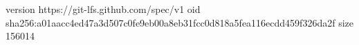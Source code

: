 version https://git-lfs.github.com/spec/v1
oid sha256:a01aacc4ed47a3d507c0fe9eb00a8eb31fcc0d818a5fea116ecdd459f326da2f
size 156014
